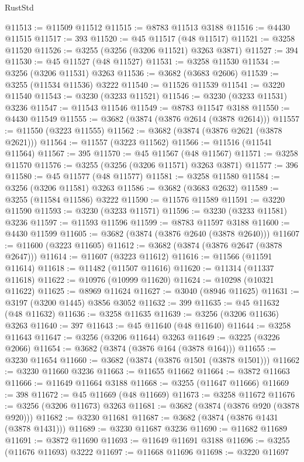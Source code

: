 \begin{lexlean}{RustStd}
\begin{coremodule}
@11513 := @11509 @11512
@11515 := @8783 @11513 @3188
@11516 := @4430 @11515
@11517 := 393
@11520 := @45 @11517 (@48 @11517)
@11521 := @3258 @11520
@11526 := @3255 (@3256 (@3206 @11521) @3263 @3871)
@11527 := 394
@11530 := @45 @11527 (@48 @11527)
@11531 := @3258 @11530
@11534 := @3256 (@3206 @11531) @3263
@11536 := @3682 (@3683 @2606)
@11539 := @3255 (@11534 @11536) @3222
@11540 := @11526 @11539
@11541 := @3220 @11540
@11543 := @3230 (@3233 @11521)
@11546 := @3230 (@3233 @11531) @3236
@11547 := @11543 @11546
@11549 := @8783 @11547 @3188
@11550 := @4430 @11549
@11555 := @3682 (@3874 (@3876 @2614 (@3878 @2614)))
@11557 := @11550 (@3223 @11555)
@11562 := @3682 (@3874 (@3876 @2621 (@3878 @2621)))
@11564 := @11557 (@3223 @11562)
@11566 := @11516 (@11541 @11564)
@11567 := 395
@11570 := @45 @11567 (@48 @11567)
@11571 := @3258 @11570
@11576 := @3255 (@3256 (@3206 @11571) @3263 @3871)
@11577 := 396
@11580 := @45 @11577 (@48 @11577)
@11581 := @3258 @11580
@11584 := @3256 (@3206 @11581) @3263
@11586 := @3682 (@3683 @2632)
@11589 := @3255 (@11584 @11586) @3222
@11590 := @11576 @11589
@11591 := @3220 @11590
@11593 := @3230 (@3233 @11571)
@11596 := @3230 (@3233 @11581) @3236
@11597 := @11593 @11596
@11599 := @8783 @11597 @3188
@11600 := @4430 @11599
@11605 := @3682 (@3874 (@3876 @2640 (@3878 @2640)))
@11607 := @11600 (@3223 @11605)
@11612 := @3682 (@3874 (@3876 @2647 (@3878 @2647)))
@11614 := @11607 (@3223 @11612)
@11616 := @11566 (@11591 @11614)
@11618 := @11482 (@11507 @11616)
@11620 := @11314 (@11337 @11618)
@11622 := @10976 (@10999 @11620)
@11624 := @10298 (@10321 @11622)
@11625 := @8969 @11624
@11627 := @3040 (@8946 @11625)
@11631 := @3197 (@3200 @1445) @3856 @3052
@11632 := 399
@11635 := @45 @11632 (@48 @11632)
@11636 := @3258 @11635
@11639 := @3256 (@3206 @11636) @3263
@11640 := 397
@11643 := @45 @11640 (@48 @11640)
@11644 := @3258 @11643
@11647 := @3256 (@3206 @11644) @3263
@11649 := @3225 (@3226 @2066)
@11654 := @3682 (@3874 (@3876 @164 (@3878 @164)))
@11655 := @3230 @11654
@11660 := @3682 (@3874 (@3876 @1501 (@3878 @1501)))
@11662 := @3230 @11660 @3236
@11663 := @11655 @11662
@11664 := @3872 @11663
@11666 := @11649 @11664 @3188
@11668 := @3255 (@11647 @11666)
@11669 := 398
@11672 := @45 @11669 (@48 @11669)
@11673 := @3258 @11672
@11676 := @3256 (@3206 @11673) @3263
@11681 := @3682 (@3874 (@3876 @920 (@3878 @920)))
@11682 := @3230 @11681
@11687 := @3682 (@3874 (@3876 @1431 (@3878 @1431)))
@11689 := @3230 @11687 @3236
@11690 := @11682 @11689
@11691 := @3872 @11690
@11693 := @11649 @11691 @3188
@11696 := @3255 (@11676 @11693) @3222
@11697 := @11668 @11696
@11698 := @3220 @11697

\end{coremodule}
\end{lexlean}

